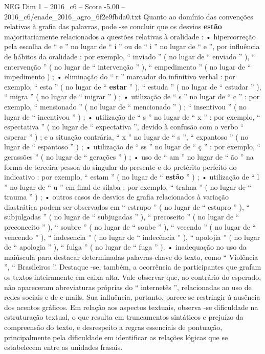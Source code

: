 \begin{textsample}{NEG Dim 1 – 2016\_c6 – Score -5.00 – 2016\_c6/enade\_2016\_agro\_6f2e9fbda0.txt}
Quanto ao domínio das convenções relativas à grafia das palavras, pode -se concluir que os desvios \textbf{estão} majoritariamente relacionados a questões relativas à oralidade : • hipercorreção pela escolha de “ e ” no lugar de “ i ” ou de “ i ” no lugar de “ e ”, por influência de hábitos da oralidade : por exemplo, “ inviado ” ( no lugar de “ enviado ” ), “ entervenção ” ( no lugar de “ intervenção ” ), “ empedimento ” ( no lugar de “ impedimento ) ; • eliminação do “ r ” marcador do infinitivo verbal : por exemplo, “ esta ” ( no lugar de “ \textbf{estar} ” ), “ estuda ” ( no lugar de “ estudar ” ), “ migra ” ( no lugar de “ migrar ” ) ; • utilização de “ s ” no lugar de “ c ” : por exemplo, “ mensionado ” ( no lugar de “ mencionado ” ) ; “ insentivou ” ( no lugar de “ incentivou ” ) ; • utilização de “ s ” no lugar de “ x ” : por exemplo, “ espectativa ” ( no lugar de “ expectativa ”, devido à confusão com o verbo “ esperar ” ) ; e a situação contrária, “ x ” no lugar de “ s ”, “ expantoso ” ( no lugar de “ espantoso ” ) ; • utilização de “ ss ” no lugar de “ ç ” : por exemplo, “ gerassões ” ( no lugar de “ gerações ” ) ; • uso de “ am ” no lugar de “ ão ” na forma de terceira pessoa do singular do presente e do pretérito perfeito do indicativo : por exemplo, “ estam ” ( no lugar de “ \textbf{estão} ” ) ; • utilização de “ l ” no lugar de “ u ” em final de sílaba : por exemplo, “ tralma ” ( no lugar de “ trauma ” ) ; • outros casos de desvios de grafia relacionados à variação diastrática podem ser observados em “ estrupo ” ( no lugar de “ estupro ” ), “ subjulgadas ” ( no lugar de “ subjugadas ” ), “ precoseito ” ( no lugar de “ preconceito ” ), “ soubre ” ( no lugar de “ soube ” ), “ vecendo ” ( no lugar de “ vencendo ” ), “ indesencia ” ( no lugar de “ indecência ” ), “ apolojia ” ( no lugar de “ apologia ” ), “ fulga ” ( no lugar de “ fuga ” ). • inadequação no uso da maiúscula para destacar determinadas palavras-chave do texto, como “ Violência ”, “ Brasileiros ”.
Destaque -se, também, a ocorrência de participantes que grafam os textos inteiramente em caixa alta.
Vale observar que, ao contrário do esperado, não apareceram abreviaturas próprias do “ internetês ”, relacionadas ao uso de redes sociais e de e-mails.
Sua influência, portanto, parece se restringir à ausência dos acentos gráficos.
Em relação aos aspectos textuais, observa -se dificuldade na estruturação textual, o que resulta em truncamentos sintáticos e prejuízo da compreensão do texto, e desrespeito a regras essenciais de pontuação, principalmente pela dificuldade em identificar as relações lógicas que se estabelecem entre as unidades frasais.

\end{textsample}
